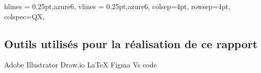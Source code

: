 \begin{appendices}
\begin{longtblr}[caption={Extrait des règles et pratiques de développement logiciel instaurées par Cegedim SRH}, label={tab:dev}]{
    hlines = {0.25pt,azure6},
    vlines = {0.25pt,azure6},
    colsep=4pt,
    rowsep=4pt,
	colspec={QX},
}
\end{longtblr}
\subsection{Outils utilisés pour la réalisation de ce rapport}
Adobe Illustrator
Draw.io
LaTeX
Figma
Vs code
\end{appendices}